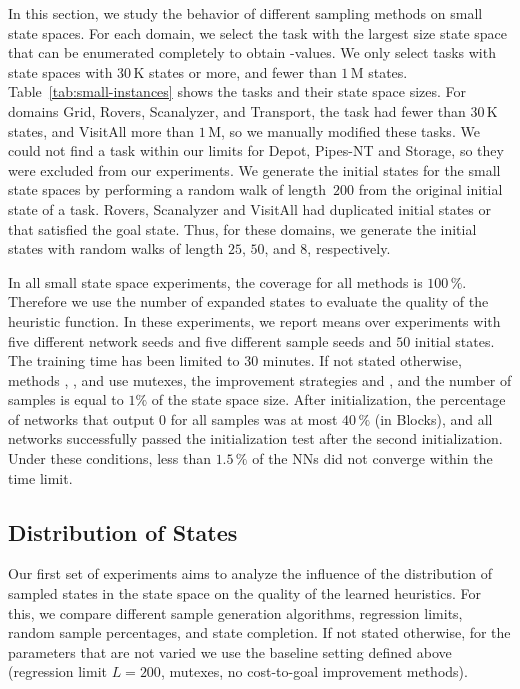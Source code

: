 In this section, we study the behavior of different sampling methods on small state spaces. For each domain, we select the task with the largest size state space that can be enumerated completely to obtain \hstar-values. We only select tasks with state spaces with $30$\,K states or more, and fewer than $1$\,M states.  Table~\ref{tab:small-instances} shows the tasks and their state space sizes. For domains Grid, Rovers, Scanalyzer, and Transport, the task had fewer than $30$\,K states, and VisitAll more than $1$\,M, so we manually modified these tasks. We could not find a task within our limits for Depot, Pipes-NT and Storage, so they were excluded from our experiments.
We generate the initial states for the small state spaces by performing a random walk of length~$200$ from the original initial state of a task. Rovers, Scanalyzer and VisitAll had duplicated initial states or that satisfied the goal state. Thus, for these domains, we generate the initial states with random walks of length $25$, $50$, and $8$, respectively.



In all small state space experiments, the coverage for all methods is $100\,\%$. Therefore we use the number of expanded states to evaluate the quality of the heuristic function.  In these experiments, we report means over experiments with five different network seeds and five different sample seeds and $50$ initial states. The training time has been limited to $30$ minutes. If not stated otherwise, methods \bfs, \dfs, \rw and \bfsrw use mutexes, the improvement strategies \hmin and \hvfc, and the number of samples is equal to $1\%$ of the state space size. After initialization, the percentage of networks that output $0$ for all samples was at most $40\,\%$ (in Blocks), and all networks successfully passed the initialization test after the second initialization. Under these conditions, less than $1.5\,\%$ of the NNs did not converge within the time limit.

\subsection{Distribution of States}
\label{sec:experiment1-subset}

Our first set of experiments aims to analyze the influence of the distribution of sampled states in the state space on the quality of the learned heuristics. For this, we compare different sample generation algorithms, regression limits, random sample percentages, and state completion. If not stated otherwise, for the parameters that are not varied we use the baseline setting defined above (regression limit $L=200$,  mutexes, no cost-to-goal improvement methods).

